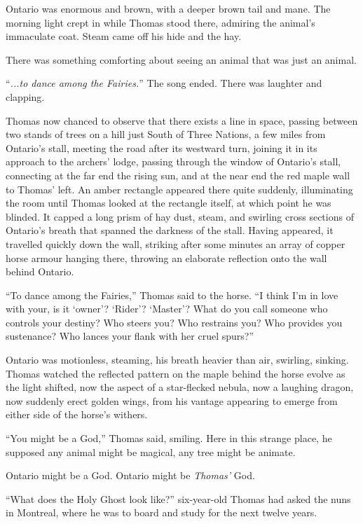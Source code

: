 \documentclass[11pt,a5paper]{article}
\begin{document}
Ontario was enormous and brown, with a deeper brown tail and mane. The morning light crept in while Thomas stood there, admiring the animal's immaculate coat. Steam came off his hide and the hay.

There was something comforting about seeing an animal that was just an animal.

``\emph{...to dance among the Fairies.}'' The song ended. There was laughter and clapping.

Thomas now chanced to observe that there exists a line in space, passing between two stands of trees on a hill just South of Three Nations, a few miles from Ontario's stall, meeting the road after its westward turn, joining it in its approach to the archers' lodge, passing through the window of Ontario's stall, connecting at the far end the rising sun, and at the near end the red maple wall to Thomas' left. An amber rectangle appeared there quite suddenly, illuminating the room until Thomas looked at the rectangle itself, at which point he was blinded. It capped a long prism of hay dust, steam, and swirling cross sections of Ontario's breath that spanned the darkness of the stall. Having appeared, it travelled quickly down the wall, striking after some minutes an array of copper horse armour hanging there, throwing an elaborate reflection onto the wall behind Ontario.

``To dance among the Fairies,'' Thomas said to the horse. ``I think I'm in love with your, is it `owner'? `Rider'? `Master'? What do you call someone who controls your destiny? Who steers you? Who restrains you? Who provides you sustenance? Who lances your flank with her cruel spurs?''

Ontario was motionless, steaming, his breath heavier than air, swirling, sinking. Thomas watched the reflected pattern on the maple behind the horse evolve as the light shifted, now the aspect of a star-flecked nebula, now a laughing dragon, now suddenly erect golden wings, from his vantage appearing to emerge from either side of the horse's withers.

``You might be a God,'' Thomas said, smiling. Here in this strange place, he supposed any animal might be magical, any tree might be animate.

Ontario might be a God. Ontario might be \emph{Thomas'} God.

``What does the Holy Ghost look like?'' six-year-old Thomas had asked the nuns in Montreal, where he was to board and study for the next twelve years.
\end{document}
